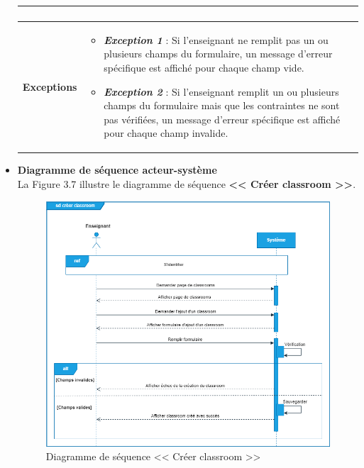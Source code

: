 \begin{itemize}[itemsep=1pt, parsep=1pt]
\begin{longtable}{|>{\RaggedRight\arraybackslash}p{4cm}|>{\RaggedRight\arraybackslash}p{12cm}|}
\begin{itemize}[label=]
\begin{enumerate}
            \end{enumerate}
        \end{itemize} \\
        \hline
        \textbf{Exceptions} & 
        \begin{itemize}[label=--]
            \item \textbf{\textit{Exception 1}} : Si l’enseignant ne remplit pas un ou plusieurs champs du formulaire, un message d’erreur spécifique est affiché pour chaque champ vide. 
            \item \textbf{\textit{Exception 2}} : Si l’enseignant remplit un ou plusieurs champs du formulaire mais que les contraintes ne sont pas vérifiées, un message d’erreur spécifique est affiché pour chaque champ invalide.
        \end{itemize} \\
        \hline
    \end{longtable}
    
    \item \textbf{Diagramme de séquence acteur-système}\\
    La Figure 3.7 illustre le diagramme de séquence \textbf{<< Créer classroom >>}.
     \begin{figure}[H]
        \centering
        \includegraphics[width=1.1\textwidth,height=0.85\textheight]{images/chp3/fig7.png}
        \caption{Diagramme de séquence << Créer classroom >>}        
        \label{fig:Diagramme de séquence << Créer classroom >>}    
    \end{figure}

\end{itemize}

